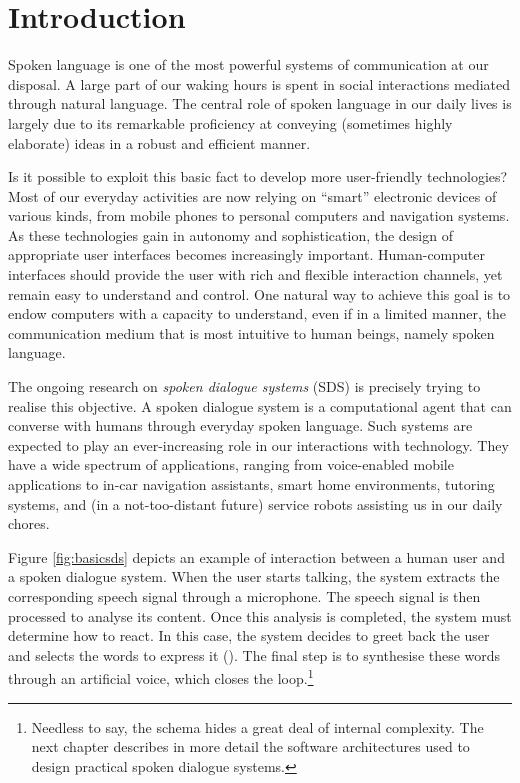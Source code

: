 
\chapter{Introduction}
\setcounter{page}{1}
\pagestyle{plain}

Spoken language is one of the most powerful systems of communication at our disposal. A large part of our waking hours is spent in social interactions mediated through natural language.  The central role of spoken language in our daily lives is largely due to its remarkable proficiency at conveying (sometimes highly elaborate) ideas in a robust and efficient manner. 

Is it possible to exploit this basic fact to develop more user-friendly technologies? Most of our everyday activities are now relying on ``smart'' electronic devices of various kinds, from mobile phones to personal computers and navigation systems. As these technologies gain in autonomy and sophistication, the design of appropriate user interfaces becomes increasingly important. Human-computer interfaces should provide the user with rich and flexible interaction channels, yet remain easy to understand and control.  One natural way to achieve this goal is to endow computers with a capacity to understand, even if in a limited manner, the communication medium that is most intuitive to human beings, namely spoken language.  

The ongoing research on \textit{spoken dialogue systems} (SDS) is precisely trying to realise this objective. A spoken dialogue system is a computational agent that can converse with humans through everyday spoken language. Such systems are expected to play an ever-increasing role in our interactions with technology. They have a wide spectrum of applications, ranging from voice-enabled mobile applications to in-car navigation assistants, smart home environments, tutoring systems, and (in a not-too-distant future) service robots assisting us in our daily chores.

Figure \ref{fig:basicsds} depicts an example of interaction between a human user and a spoken dialogue system. When the user starts talking, the system extracts the corresponding speech signal through a microphone.  The speech signal is then processed to analyse its content.  Once this analysis is completed, the system must determine how to react.  In this case, the system decides to greet back the user and selects the words to express it (). The final step is to synthesise these words through an artificial voice, which closes the loop.\footnote{ Needless to say, the schema hides a great deal of internal complexity.  The next chapter describes in more detail the software architectures used to design practical spoken dialogue systems.}

